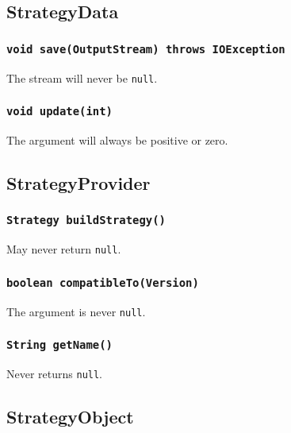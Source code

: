 \documentclass{article}
\begin{document}
\subsection{StrategyData}

\subsubsection{\texttt{void save(OutputStream) throws IOException}}
The stream will never be \texttt{null}.

\subsubsection{\texttt{void update(int)}}
The argument will always be positive or zero.

\subsection{StrategyProvider}

\subsubsection{\texttt{Strategy buildStrategy()}}
May never return \texttt{null}.

\subsubsection{\texttt{boolean compatibleTo(Version)}}
The argument is never \texttt{null}.

\subsubsection{\texttt{String getName()}}
Never returns \texttt{null}.

\subsection{StrategyObject}
\end{document}

